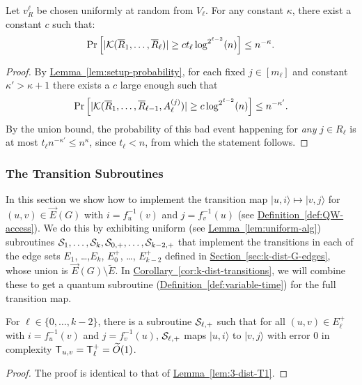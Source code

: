 \documentclass{theoretics}
\renewcommand{\sec}[1]{\hyperref[sec:#1]{Section~\ref*{sec:#1}}}
\newcommand{\lem}[1]{\hyperref[lem:#1]{Lemma~\ref*{lem:#1}}}
\newcommand{\cor}[1]{\hyperref[cor:#1]{Corollary~\ref*{cor:#1}}}
\newcommand{\defin}[1]{\hyperref[def:#1]{Definition~\ref*{def:#1}}}
\def\ket#1{{\lvert}#1\rangle}
\renewcommand{\>}{\rangle}
\newcommand{\<}{\langle}
\renewcommand{\(}{\left(}
\renewcommand{\)}{\right)}
\begin{document}
\begin{corollary}\label{cor:col-prob}
Let $v_{R}^{\ell}$ be chosen uniformly at random from $V_{\ell}$. 
	For any constant $\kappa$, there exist a constant $c$ such that:
	$$\Pr\left[|{\cal K}(\overline{R}_1,\dots,\overline{R}_{\ell})|\geq ct_{\ell}\log^{2^{\ell-2}}(n)\right]\leq n^{-\kappa}.$$
\end{corollary}
\begin{proof}
	By \lem{setup-probability}, for each fixed $j \in [m_{\ell}]$ and constant $\kappa'>\kappa+1$ there exists a $c$ large enough such that
	$$\Pr\left[ |{\cal K}(\overline{R}_1,\dots,\overline{R}_{\ell-1},A_{\ell}^{(j)})|\geq c\log^{2^{\ell-2}}(n)\right]\leq {n^{-\kappa'}}.$$
By the union bound, the probability of this bad event happening for \emph{any} $j\in R_{\ell}$ is at most $t_{\ell} n^{-\kappa'}\leq n^{\kappa}$, since $t_{\ell}<n$, from which the statement follows.
\end{proof}





\subsubsection{The Transition Subroutines}\label{sec:k-dist-transitions}

In this section we show how to implement the transition map  $\ket{u,i}{\mapsto}\ket{v,j}$ for $(u,v)\in\overrightarrow{E}(G)$ with $i=f_u^{-1}(v)$ and $j=f_v^{-1}(u)$ (see \defin{QW-access}). We do this by exhibiting uniform (see \lem{uniform-alg}) subroutines ${\cal S}_1,\dots,{\cal S}_k,{\cal S}_{0,+},\dots,{\cal S}_{k-2,+}$ that implement the transitions in each of the edge sets $E_1$, \dots ,$E_k$, $E_0^+$, \dots, $E_{k-2}^+$ defined in \sec{k-dist-G-edges}, whose union is $\overrightarrow{E}(G)\setminus \tilde{E}$. In \cor{k-dist-transitions}, we will combine these to get a quantum subroutine (\defin{variable-time}) for the full transition map. 

\begin{lemma}\label{lem:k-dist-T1}
For $\ell \in \{0,\dots,k-2\}$, there is a subroutine ${\cal S}_{\ell,+}$ such that for all $(u,v)\in E_{\ell}^+$ with $i=f_u^{-1}(v)$ and $j=f_v^{-1}(u)$, ${\cal S}_{\ell,+}$ maps $\ket{u,i}$ to $\ket{v,j}$ with error 0 in complexity ${\sf T}_{u,v}={\sf T}_{\ell}^+=\widetilde{O}(1)$.
\end{lemma}
\begin{proof} The proof is identical to that of \lem{3-dist-T1}.\end{proof}
\end{document}
